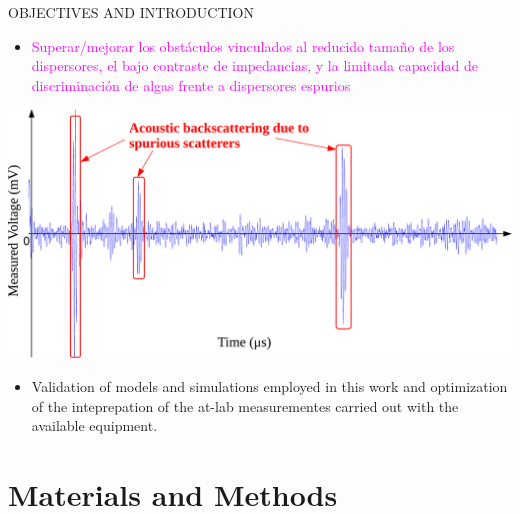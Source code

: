 \documentclass[handout]{beamer}
\begin{document}
\begin{frame}{OBJECTIVES AND INTRODUCTION}
		\vspace{2px}
		\begin{minipage}[c]{1\linewidth}
		\begin{minipage}[c]{0.45\linewidth}
			\begin{itemize}
				\item \textcolor{magenta}{Superar/mejorar los obstáculos vinculados al reducido tamaño de los dispersores, el bajo contraste de impedancias, y la limitada capacidad de discriminación de algas frente a dispersores espurios}
			\end{itemize}
		\end{minipage}
		\hspace{1px}
		\begin{minipage}[c]{0.53\linewidth}
			 {\centering \includegraphics[width=0.4\paperwidth]{./imagenes/respuestones}}
		\end{minipage}
		
		\vspace{2px}
%				
		\end{minipage}
		
		\begin{itemize}		
		\item Validation of models and simulations employed in this work and optimization of the inteprepation of the at-lab measurementes carried out with the available equipment.
		\end{itemize}
		
\end{frame}


\section{Materials and Methods}
\end{document}

